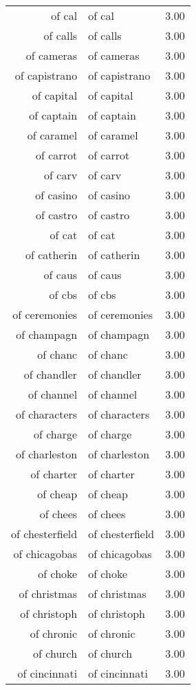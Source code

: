 \begin{table}[ht]
\begin{tabular}{rlr}
  of cal & of cal & 3.00 \\ 
  of calls & of calls & 3.00 \\ 
  of cameras & of cameras & 3.00 \\ 
  of capistrano & of capistrano & 3.00 \\ 
  of capital & of capital & 3.00 \\ 
  of captain & of captain & 3.00 \\ 
  of caramel & of caramel & 3.00 \\ 
  of carrot & of carrot & 3.00 \\ 
  of carv & of carv & 3.00 \\ 
  of casino & of casino & 3.00 \\ 
  of castro & of castro & 3.00 \\ 
  of cat & of cat & 3.00 \\ 
  of catherin & of catherin & 3.00 \\ 
  of caus & of caus & 3.00 \\ 
  of cbs & of cbs & 3.00 \\ 
  of ceremonies & of ceremonies & 3.00 \\ 
  of champagn & of champagn & 3.00 \\ 
  of chanc & of chanc & 3.00 \\ 
  of chandler & of chandler & 3.00 \\ 
  of channel & of channel & 3.00 \\ 
  of characters & of characters & 3.00 \\ 
  of charge & of charge & 3.00 \\ 
  of charleston & of charleston & 3.00 \\ 
  of charter & of charter & 3.00 \\ 
  of cheap & of cheap & 3.00 \\ 
  of chees & of chees & 3.00 \\ 
  of chesterfield & of chesterfield & 3.00 \\ 
  of chicagobas & of chicagobas & 3.00 \\ 
  of choke & of choke & 3.00 \\ 
  of christmas & of christmas & 3.00 \\ 
  of christoph & of christoph & 3.00 \\ 
  of chronic & of chronic & 3.00 \\ 
  of church & of church & 3.00 \\ 
  of cincinnati & of cincinnati & 3.00 \\ 

\end{tabular}
\end{table}
